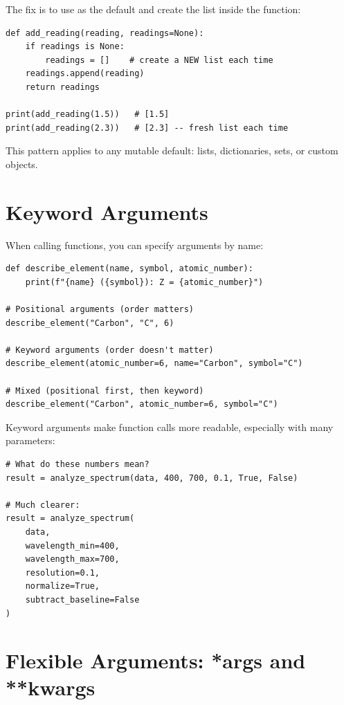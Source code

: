 \begin{tip}
The fix is to use  as the default and create the list inside the function:
\begin{lstlisting}
def add_reading(reading, readings=None):
    if readings is None:
        readings = []    # create a NEW list each time
    readings.append(reading)
    return readings

print(add_reading(1.5))   # [1.5]
print(add_reading(2.3))   # [2.3] -- fresh list each time
\end{lstlisting}
This pattern applies to any mutable default: lists, dictionaries, sets, or custom objects.
\end{tip}

\section{Keyword Arguments}
\label{sec:keyword-args}

When calling functions, you can specify arguments by name:

\begin{lstlisting}
def describe_element(name, symbol, atomic_number):
    print(f"{name} ({symbol}): Z = {atomic_number}")

# Positional arguments (order matters)
describe_element("Carbon", "C", 6)

# Keyword arguments (order doesn't matter)
describe_element(atomic_number=6, name="Carbon", symbol="C")

# Mixed (positional first, then keyword)
describe_element("Carbon", atomic_number=6, symbol="C")
\end{lstlisting}

Keyword arguments make function calls more readable, especially with many parameters:

\begin{lstlisting}
# What do these numbers mean?
result = analyze_spectrum(data, 400, 700, 0.1, True, False)

# Much clearer:
result = analyze_spectrum(
    data,
    wavelength_min=400,
    wavelength_max=700,
    resolution=0.1,
    normalize=True,
    subtract_baseline=False
)
\end{lstlisting}

\section{Flexible Arguments: *args and **kwargs}
\label{sec:args-kwargs}

